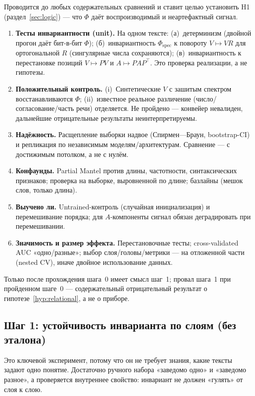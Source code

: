 \documentclass[11pt,a4paper]{article}
\theoremstyle{definition}
\theoremstyle{plain}
\begin{document}
Проводится до любых содержательных сравнений и ставит целью установить H1
(раздел~\ref{sec:logic}) — что $\Phi$ даёт воспроизводимый и неартефактный сигнал.

\begin{enumerate}[label=(\arabic*)]
\item \textbf{Тесты инвариантности (unit).} На одном тексте: (а)~детерминизм (двойной прогон
даёт бит-в-бит $\Phi$); (б)~инвариантность $\Phi_{\mathrm{spec}}$ к повороту $V\mapsto VR$ для
ортогональной $R$ (сингулярные числа сохраняются); (в)~инвариантность к перестановке позиций
$V\mapsto PV$ и $A\mapsto PAP^\top$. Это проверка реализации, а не гипотезы.
\item \textbf{Положительный контроль.} (i)~Синтетические $V$ с зашитым спектром
восстанавливаются $\Phi$; (ii)~известное реальное различение (число/согласование/часть речи)
отделяется. Не пройдено — конвейер невалиден, дальнейшие отрицательные результаты
неинтерпретируемы.
\item \textbf{Надёжность.} Расщепление выборки надвое (Спирмен—Браун, bootstrap-CI) и
репликация по независимым моделям/архитектурам. Сравнение — с достижимым потолком, а не с нулём.
\item \textbf{Конфаунды.} Partial Mantel против длины, частотности, синтаксических признаков;
проверка на выборке, выровненной по длине; базлайны (мешок слов, только длина).
\item \textbf{Выучено ли.} Untrained-контроль (случайная инициализация) и перемешивание порядка;
для $A$-компоненты сигнал обязан деградировать при перемешивании.
\item \textbf{Значимость и размер эффекта.} Перестановочные тесты; cross-validated AUC
«одно/разные»; выбор слоя/головы/метрики — на отложенной части (nested CV), иначе двойное
использование данных.
\end{enumerate}

Только после прохождения шага~0 имеет смысл шаг~1; провал шага~1 при пройденном шаге~0 —
содержательный отрицательный результат о гипотезе~\ref{hyp:relational}, а не о приборе.

\subsection{Шаг 1: устойчивость инварианта по слоям (без эталона)}

Это ключевой эксперимент, потому что он не требует знания, какие тексты задают одно понятие.
Достаточно ручного набора «заведомо одно» и «заведомо разное», а проверяется внутреннее
свойство: инвариант не должен «гулять» от слоя к слою.
\end{document}
